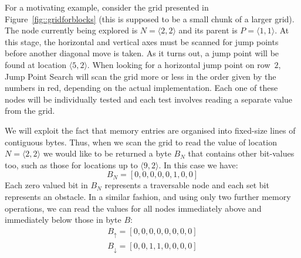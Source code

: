 
For a motivating example, consider the grid presented in 
Figure~\ref{fig::gridforblocks} 
(this is supposed to be a small chunk of a larger grid).  
The node currently being explored is $N = \langle 2,2\rangle$ 
and its parent is $P = \langle 1,1\rangle$.  
At this stage, the horizontal and vertical axes must be scanned 
for jump points before another diagonal move is taken.  
As it turns out, a jump point will be found at location $\langle 5,2\rangle$.  
When looking for a horizontal jump point on row~$2$, Jump Point Search will 
scan the grid more or less in the order given by the numbers in red, 
depending on the actual implementation.  
Each one of these nodes will be individually tested and each test
involves reading a separate value from the grid.

We will exploit the fact that memory entries are organised into fixed-size 
lines of contiguous bytes. Thus, when we scan the grid to read the value of 
location $N = \langle 2, 2\rangle$ we would like to be returned a byte $B_N$
that contains other bit-values too, such as those for locations up to
$\langle 9, 2\rangle$. In this case we have:
\begin{equation}
B_{N} = [0,0,0,0,0,1,0,0]
\end{equation}
Each zero valued bit in $B_N$ represents a traversable node and each set bit
represents an obstacle.
In a similar fashion, and using only two further memory operations, we can read the values for all nodes
immediately above and immediately below those in byte $B$:
\begin{gather}
B_{\uparrow} = [0, 0, 0, 0, 0, 0, 0, 0]\\
B_{\downarrow} = [0, 0, 1, 1, 0, 0, 0, 0]
\end{gather}

